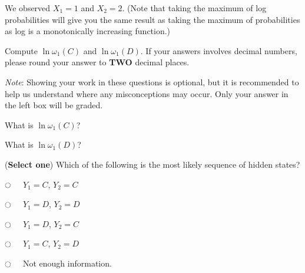 \documentclass[11pt,addpoints,answers]{exam}
\newcommand{\emptycircle}{{\LARGE $\fullmoon$}\ \ }
\newcommand{\filledcircle}{{\LARGE $\newmoon$}\ \ }
\begin{document}
\begin{questions}
\begin{parts}
 We observed $X_1 = 1$ and $X_2 = 2$. (Note that taking the maximum of log probabilities will give you the same result as taking the maximum of probabilities as log is a monotonically increasing function.)

    
\begin{subparts}
    \subpart[1] Compute $\ln{\omega_1(C)}$ and $\ln{\omega_1(D)}$. If your answers involves decimal numbers, please round your answer to \textbf{TWO} decimal places.
    
    \textit{Note}: Showing your work in these questions is optional, but it is recommended to help us understand where any misconceptions may occur. Only your answer in the left box will be graded.
    
    What is $\ln{\omega_1(C)}$? \\
    \begin{your_solution}[title=$\ln{\omega_1(C)}$,height=2cm,width=3cm]
    \end{your_solution}
    \begin{your_solution}[title=Work,height=4cm,width=12cm]
    \end{your_solution}
    
    What is $\ln{\omega_1(D)}$? \\
    \begin{your_solution}[title=$\ln{\omega_1(D)}$,height=2cm,width=3cm]
    \end{your_solution}
    \begin{your_solution}[title=Work,height=4cm,width=12cm]
    \end{your_solution}
    
    \clearpage 
    
    \subpart[2] (\textbf{Select one}) Which of the following is the most likely sequence of hidden states? 
    
    \begin{list}{}
        \item 
            \emptycircle
            $Y_1=C$, $Y_2=C$ 
        \item 
            \emptycircle 
            $Y_1=D$, $Y_2=D$ 
        \item 
            \emptycircle
            $Y_1=D$, $Y_2=C$
        \item 
            \emptycircle
            $Y_1=C$, $Y_2=D$ 
        \item 
            \emptycircle
            Not enough information. 
    \end{list}
    

\end{subparts}
\end{parts}
\end{questions}
\end{document}
